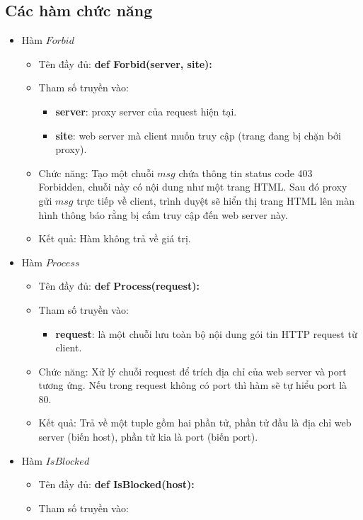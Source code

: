 \documentclass[12pt,a4paper]{article}
\begin{document}
		\subsection{Các hàm chức năng}
			\begin{itemize}
				\item Hàm $Forbid$
					\begin{itemize}
						\item Tên đầy đủ: \textbf{def Forbid(server, site):}
						\item Tham số truyền vào: 
							\begin{itemize}
								\item \textbf{server}: proxy server của request hiện tại.
								\item \textbf{site}: web server mà client muốn truy cập (trang đang bị chặn bởi proxy).
							\end{itemize}
						\item Chức năng: Tạo một chuỗi $msg$ chứa thông tin status code 403 Forbidden, chuỗi này có nội dung như một trang HTML. Sau đó proxy gửi $msg$ trực tiếp về client, trình duyệt sẽ hiển thị trang HTML lên màn hình thông báo rằng bị cấm truy cập đến web server này.
						\item Kết quả: Hàm không trả về giá trị.
					\end{itemize}
				\item Hàm $Process$
					\begin{itemize}
						\item Tên đầy đủ: \textbf{def Process(request):}
						\item Tham số truyền vào:
							\begin{itemize}
								\item \textbf{request}: là một chuỗi lưu toàn bộ nội dung gói tin HTTP request từ client.
							\end{itemize}
						\item Chức năng: Xử lý chuỗi request để trích địa chỉ của web server và port tương ứng. Nếu trong request không có port thì hàm sẽ tự hiểu port là 80.
						\item Kết quả: Trả về một tuple gồm hai phần tử, phần tử đầu là địa chỉ web server (biến host), phần tử kia là port (biến port). 
					\end{itemize}
				\item Hàm $IsBlocked$
					\begin{itemize}
						\item Tên đầy đủ: \textbf{def IsBlocked(host):}
						\item Tham số truyền vào:

\end{itemize}
\end{itemize}
\end{document}
